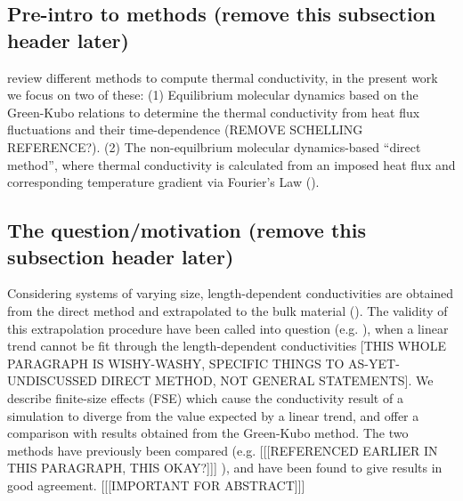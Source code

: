 \documentclass[%
preprint,                                  %
nofootinbib,
 amsmath,amssymb,
 aps,
]{revtex4-1}
\begin{document}

\subsection{\label{sec:intro.pre}Pre-intro to methods (remove this subsection header later)}

\citet{Stackhouse2010} review different methods to compute thermal conductivity, in the present work we focus on two of these:
(1) Equilibrium molecular dynamics based on the Green-Kubo relations to determine the thermal conductivity from heat flux fluctuations and their time-dependence (\citet{Green1954,Kubo1957,Kubo1966,Schelling2002}REMOVE SCHELLING REFERENCE?). 
(2) The non-equilbrium molecular dynamics-based ``direct method'', where thermal conductivity is calculated from an imposed heat flux and corresponding temperature gradient via Fourier's Law (\citet{Muller-Plathe1997,Nieto-Draghi2013}).


\subsection{\label{sec:intro.question}The question/motivation (remove this subsection header later)}

Considering systems of varying size, length-dependent conductivities are obtained from the direct method and extrapolated to the bulk material (\citet{Schelling2002}). The validity of this extrapolation procedure have been called into question (e.g. \citet{Sellan2010}), when a linear trend cannot be fit through the length-dependent conductivities [THIS WHOLE PARAGRAPH IS WISHY-WASHY, SPECIFIC THINGS TO AS-YET-UNDISCUSSED DIRECT METHOD, NOT GENERAL STATEMENTS]. We describe finite-size effects (FSE) which cause the conductivity result of a simulation to diverge from the value expected by a linear trend, and offer a comparison with results obtained from the Green-Kubo method. The two methods have previously been compared (e.g. \citet{Schelling2002} [[[REFERENCED EARLIER IN THIS PARAGRAPH, THIS OKAY?]]] ), and have been found to give results in good agreement. [[[IMPORTANT FOR ABSTRACT]]]
\end{document}
